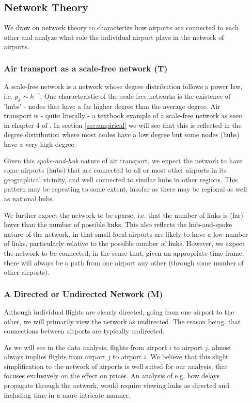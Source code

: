 \subsection{Network Theory}
\label{subsec:Network Theory}
We draw on network theory to characterize how airports are connected to each other and analyze what role the individual airport plays in the network of airports. %

\subsubsection{Air transport as a scale-free network (T)}
A scale-free network is a network whose degree distribution follows a power law, i.e. $p_k \sim k^{-\gamma}$. One characteristic of the scale-free networks is the existence of 'hubs' - nodes that have a far higher degree than the average degree. Air transport is - quite literally - a textbook example of a scale-free network as seen in chapter 4 of \citet{barabasi2016networks}. In section \ref{sec:empirical} we will see that this is reflected in the degree distribution where most nodes have a low degree but some nodes (hubs) have a very high degree.
\par
Given this \textit{spoke-and-hub} nature of air transport, we expect the network to have some airports (hubs) that are connected to all or most other airports in its geographical vicinity, and well connected to similar hubs in other regions. This pattern may be repeating to some extent, insofar as there may be regional as well as national hubs.
\par
We further expect the network to be sparse, i.e. that the number of links is (far) lower than the number of possible links. This also reflects the hub-and-spoke nature of the network, in that small local airports are likely to have a low number of links, particularly relative to the possible number of links. However, we expect the network to be connected, in the sense that, given an appropriate time frame, there will always be a path from one airport any other (through some number of other airports).

\subsubsection{A Directed or Undirected Network (M)}
Although individual flights are clearly directed, going from one airport to the other, we will primarily view the network as undirected. The reason being, that connections between airports are typically undirected.
\par
As we will see in the data analysis, flights from airport $i$ to airport $j$, almost always implies flights from airport $j$ to airport $i$. We believe that this slight simplification to the network of airports is well suited for our analysis, that focuses exclusively on the effect on prices. An analysis of e.g. how delays propagate through the network, would require viewing links as directed and including time in a more intricate manner.

